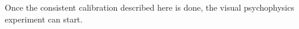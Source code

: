 \documentclass[acmtocl,acmnow]{acmtrans2m}
\begin{document}
Once the consistent calibration described here is done, the visual psychophysics experiment can start.
% 
% 
% 
\end{document}
